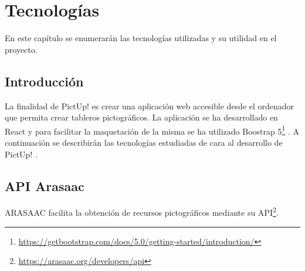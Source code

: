 \chapter{Tecnologías}
\label{cap:introduccion}


\begin{resumen}
	En este capítulo se enumerarán las tecnologías utilizadas y su utilidad en el proyecto.
\end{resumen}

\label{cap1:sec:Motivacion}


\section{Introducción}

La finalidad de PictUp! es crear una aplicación web accesible desde el ordenador que permita crear tableros pictográficos. La aplicación se ha desarrollado en React y para facilitar la maquetación de la misma se ha utilizado Boostrap 5\footnote{\url{https://getbootstrap.com/docs/5.0/getting-started/introduction/}} . 
A continuación se describirán las tecnologías estudiadas de cara al desarrollo de PictUp! .


\section{API Arasaac}
ARASAAC facilita la obtención de recursos pictográficos mediante su API\footnote{\url{https://arasaac.org/developers/api}}. 

